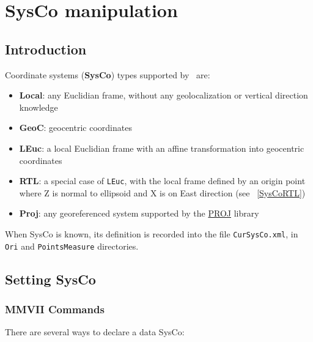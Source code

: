 \chapter{SysCo manipulation}
\label{Chap:SysCo}



\section{Introduction}

Coordinate systems (\textbf{SysCo}) types supported by \CdPPP\ are:
\begin{itemize}
\item \textbf{Local}: any Euclidian frame, without any geolocalization or vertical direction knowledge
\item \textbf{GeoC}: geocentric coordinates
\item \textbf{LEuc}: a local Euclidian frame with an affine transformation into geocentric coordinates
\item \textbf{RTL}: a special case of \texttt{LEuc}, with the local frame defined by an origin point where Z is normal to ellipsoid and X is on East direction (see ~\ref{SysCoRTL})
\item \textbf{Proj}: any georeferenced system supported by the \href{https://proj.org}{PROJ} library
\end{itemize}

When SysCo is known, its definition is recorded into the file \texttt{CurSysCo.xml}, in \texttt{Ori} and \texttt{PointsMeasure} directories.


\section{Setting SysCo}

\subsection{MMVII Commands}
There are several ways to declare a data SysCo:

